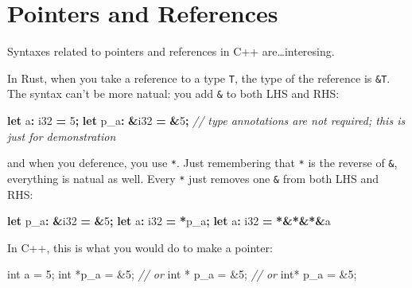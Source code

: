 \documentclass[
]{book}
\newenvironment{Shaded}{\begin{snugshade}}{\end{snugshade}}
\newcommand{\CommentTok}[1]{\textcolor[rgb]{0.56,0.35,0.01}{\textit{#1}}}
\newcommand{\DataTypeTok}[1]{\textcolor[rgb]{0.13,0.29,0.53}{#1}}
\newcommand{\DecValTok}[1]{\textcolor[rgb]{0.00,0.00,0.81}{#1}}
\newcommand{\KeywordTok}[1]{\textcolor[rgb]{0.13,0.29,0.53}{\textbf{#1}}}
\newcommand{\NormalTok}[1]{#1}
\newcommand{\OperatorTok}[1]{\textcolor[rgb]{0.81,0.36,0.00}{\textbf{#1}}}
\begin{document}
\hypertarget{pointers-and-references}{%
\section{Pointers and References}\label{pointers-and-references}}

Syntaxes related to pointers and references in C++ are\ldots interesing.

In Rust, when you take a reference to a type \texttt{T}, the type of the reference is \texttt{\&T}. The syntax can't be more natual: you add \texttt{\&} to both LHS and RHS:

\begin{Shaded}
\begin{Highlighting}[]
\KeywordTok{let}\NormalTok{   a}\OperatorTok{:}  \DataTypeTok{i32} \OperatorTok{=}  \DecValTok{5}\OperatorTok{;}
\KeywordTok{let}\NormalTok{ p\_a}\OperatorTok{:} \OperatorTok{\&}\DataTypeTok{i32} \OperatorTok{=} \OperatorTok{\&}\DecValTok{5}\OperatorTok{;} \CommentTok{// type annotations are not required; this is just for demonstration}
\end{Highlighting}
\end{Shaded}

and when you deference, you use \texttt{*}. Just remembering that \texttt{*} is the reverse of \texttt{\&}, everything is natual as well. Every \texttt{*} just removes one \texttt{\&} from both LHS and RHS:

\begin{Shaded}
\begin{Highlighting}[]
\KeywordTok{let}\NormalTok{ p\_a}\OperatorTok{:} \OperatorTok{\&}\DataTypeTok{i32} \OperatorTok{=} \OperatorTok{\&}\DecValTok{5}\OperatorTok{;}
\KeywordTok{let}\NormalTok{   a}\OperatorTok{:}  \DataTypeTok{i32} \OperatorTok{=} \OperatorTok{*}\NormalTok{p\_a}\OperatorTok{;}
\KeywordTok{let}\NormalTok{   a}\OperatorTok{:}  \DataTypeTok{i32} \OperatorTok{=} \OperatorTok{*\&*\&*\&}\NormalTok{a}
\end{Highlighting}
\end{Shaded}

In C++, this is what you would do to make a pointer:

\begin{Shaded}
\begin{Highlighting}[]
\DataTypeTok{int}\NormalTok{    a =  }\DecValTok{5}\NormalTok{;}
\DataTypeTok{int}\NormalTok{ *p\_a = \&}\DecValTok{5}\NormalTok{;}
\CommentTok{// or}
\DataTypeTok{int}\NormalTok{ * p\_a = \&}\DecValTok{5}\NormalTok{;}
\CommentTok{// or}
\DataTypeTok{int}\NormalTok{*  p\_a = \&}\DecValTok{5}\NormalTok{;}
\end{Highlighting}
\end{Shaded}
\end{document}
